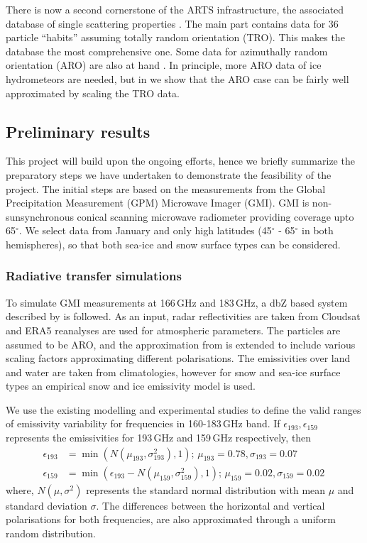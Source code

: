 \documentclass[12pt,oneside,a4paper]{article}
\begin{document}
There is now a second cornerstone of the ARTS infrastructure, the associated
database of single scattering properties \citep{eriksson:agene:18}. The main part contains data for 36 particle ``habits'' assuming totally random
orientation (TRO). This makes the database the most comprehensive one.
Some data for azimuthally random orientation (ARO) are also at hand
\citep{brath:micro:20,ekelund:micro:20}. In principle, more ARO data of ice hydrometeors are needed, but in \citet{baralakas:intro:21} we show that the ARO case can be fairly well approximated by scaling the TRO data.

\subsection{Preliminary results}
%
This project will build upon the ongoing efforts, hence we briefly summarize the preparatory steps we have undertaken to demonstrate the feasibility of the project. The initial steps are based on the  measurements from the Global Precipitation Measurement (GPM) Microwave Imager (GMI). GMI is non-sunsynchronous conical scanning microwave radiometer providing coverage upto 65$^{\circ}$. We select data from January and only high latitudes (45$^{\circ}$ - 65$^{\circ}$ in both hemispheres), so that both sea-ice and snow surface types can be considered. 

\subsubsection{Radiative transfer simulations}
%
\label{sec:radiative_transfer}
To simulate GMI measurements at 166\,GHz and 183\,GHz, a dbZ based system described by \citet{ekelund:using:20} is followed. As an input, radar reflectivities are taken from Cloudsat and ERA5 reanalyses are used for atmospheric parameters. The particles are assumed to be ARO, and the approximation from \citet{baralakas:intro:21} is extended to include various scaling factors approximating different polarisations. The emissivities over land and water are taken from climatologies, however for snow and sea-ice surface types an empirical snow and ice emissivity model is used. 

We use the existing modelling and experimental studies \citep{harlow:2009:milli, hewison:2002:airbo} to define the valid ranges of emissivity variability for frequencies in 160-183\,GHz band. If $\epsilon_{193}, \epsilon_{159}$ represents the emissivities for 193\,GHz and 159\,GHz respectively, then
\begin{align}
\epsilon_{193}& = \min({N(\mu_{193}, \sigma_{193}^{2}), 1});\, \mu_{193} = 0.78, \sigma_{193} = 0.07 \label{eq:1}\\
\epsilon_{159}& = \min(\epsilon_{193} - N(\mu_{159}, \sigma_{159}^{2}), 1) ;\,  \mu_{159} = 0.02, \sigma_{159} = 0.02\,\label{eq:2}
\end{align}
where, $N(\mu, \sigma^{2})$ represents the standard normal distribution with mean $\mu$ and standard deviation $\sigma$. The differences between the horizontal and vertical polarisations for both frequencies, are also approximated through a uniform random distribution. 
\end{document}
